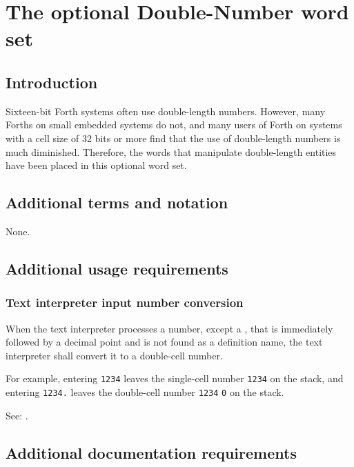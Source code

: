
\chapter{The optional Double-Number word set} %

\section{Introduction} %

Sixteen-bit Forth systems often use double-length numbers. However,
many Forths on small embedded systems do not, and many users of Forth
on systems with a cell size of 32 bits or more find that the use of
double-length numbers is much diminished. Therefore, the words that
manipulate double-length entities have been placed in this optional
word set.

\section{Additional terms and notation} %

None.

\section{Additional usage requirements} %

\subsection{Text interpreter input number conversion} %

When the text interpreter processes a number, except a ,
that is immediately followed by a decimal point and is not found
as a definition name, the text interpreter shall convert it to a
double-cell number.

For example, entering  \texttt{1234} leaves the
single-cell number \texttt{1234} on the stack, and entering
 \texttt{1234.} leaves the double-cell number
\texttt{1234} \texttt{0} on the stack.

See: .


\section{Additional documentation requirements} %


